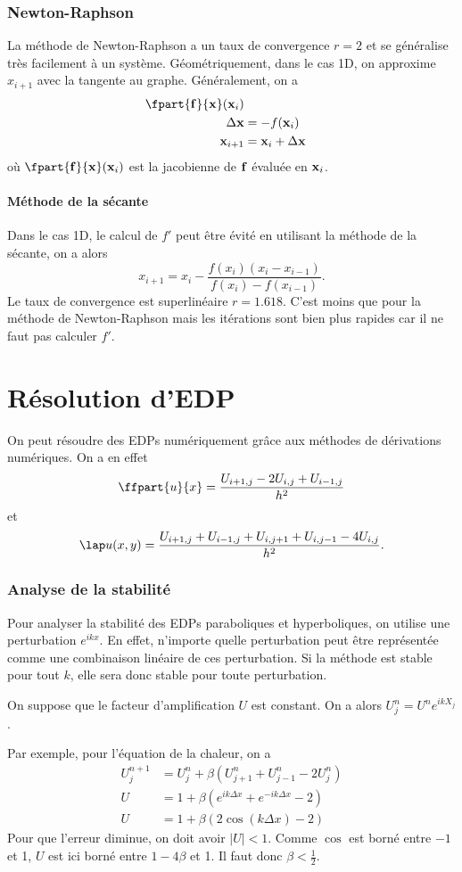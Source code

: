 \section{Newton-Raphson}
La méthode de Newton-Raphson a un taux de convergence $r = 2$ et
se généralise très facilement à un système.
Géométriquement, dans le cas 1D,
on approxime $x_{i+1}$ avec la tangente au graphe.
Généralement, on a
\begin{align*}
  \fpart{\fv{f}}{\fv{x}}(\fv{x}_i)\\
  \Delta \fv{x} & = -f(\fv{x}_i)\\
  \fv{x}_{i+1} & = \fv{x}_i + \Delta \fv{x}
\end{align*}
où $\fpart{\fv{f}}{\fv{x}}(\fv{x}_i)$ est la jacobienne de ${\bf f}$ évaluée
en ${\bf x}_i$.

\subsection{Méthode de la sécante}
Dans le cas 1D,
le calcul de $f'$ peut être évité en utilisant la méthode
de la sécante, on a alors
\[ x_{i+1} = x_i - \frac{f(x_i)(x_i - x_{i-1})}
{f(x_i) - f(x_{i-1})}. \]
Le taux de convergence est superlinéaire $r = 1.618$.
C'est moins que pour la méthode de Newton-Raphson mais les itérations
sont bien plus rapides car il ne faut pas calculer $f'$.

\part{Résolution d'EDP}
On peut résoudre des EDPs numériquement grâce aux méthodes de dérivations
numériques.
On a en effet
\[ \ffpart{u}{x} = \frac{U_{i+1,j} - 2 U_{i,j} + U_{i-1,j}}{h^2} \]
et
\[ \lap u(x, y) =
\frac{U_{i+1,j} + U_{i-1,j} + U_{i,j+1} + U_{i,j-1} -4U_{i,j}}{h^2}. \]

\section{Analyse de la stabilité}
Pour analyser la stabilité des EDPs paraboliques et hyperboliques,
on utilise une perturbation $e^{ikx}$.
En effet, n'importe quelle perturbation peut être représentée
comme une combinaison linéaire de ces perturbation.
Si la méthode est stable pour tout $k$,
elle sera donc stable pour toute perturbation.

On suppose que le facteur d'amplification $U$ est constant.
On a alors $U_j^n = U^n e^{ikX_j}$.

Par exemple, pour l'équation de la chaleur, on a
\begin{align*}
  U_j^{n+1} & = U_j^n + \beta(U_{j+1}^n + U_{j-1}^n - 2U_j^n)\\
  U & = 1 + \beta(e^{ik\Delta x} + e^{-ik\Delta x} - 2)\\
  U & = 1 + \beta(2\cos(k\Delta x) - 2)
\end{align*}
Pour que l'erreur diminue, on doit avoir $|U| < 1$.
Comme $\cos$ est borné entre $-1$ et 1, $U$ est ici borné entre
$1 - 4\beta$ et 1.
Il faut donc $\beta < \frac{1}{2}$.

